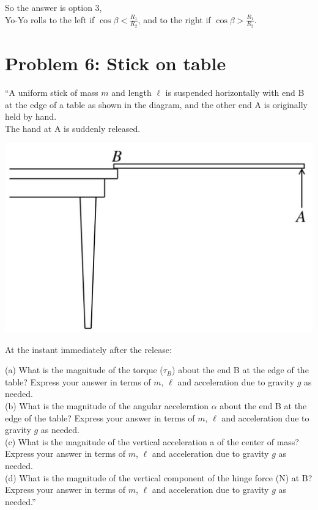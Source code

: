 \documentclass[8.01x]{subfiles}
\begin{document}
So the answer is option 3,\\
Yo-Yo rolls to the left if $\displaystyle \cos \beta < \frac{R_1}{R_2}$, and to the right if $\displaystyle \cos \beta > \frac{R_1}{R_2}$.

\section{Problem 6: Stick on table}

``A uniform stick of mass $m$ and length $\ell$ is suspended horizontally with end B at the edge of a table as shown in the diagram, and the other end A is originally held by hand.\\
The hand at A is suddenly released.

\begin{center}
\includegraphics[scale=0.45]{Graphics/h7p6}
\end{center}

At the instant immediately after the release:

(a) What is the magnitude of the torque ($\tau_B$) about the end B at the edge of the table? Express your answer in terms of $m$, $\ell$ and acceleration due to gravity $g$ as needed.\\
(b) What is the magnitude of the angular acceleration $\alpha$ about the end B at the edge of the table? Express your answer in terms of $m$, $\ell$ and acceleration due to gravity $g$ as needed.\\
(c) What is the magnitude of the vertical acceleration a of the center of mass? Express your answer in terms of $m$, $\ell$ and acceleration due to gravity $g$ as needed.\\
(d) What is the magnitude of the vertical component of the hinge force (N) at B? Express your answer in terms of $m$, $\ell$ and acceleration due to gravity $g$ as needed.''
\end{document}
